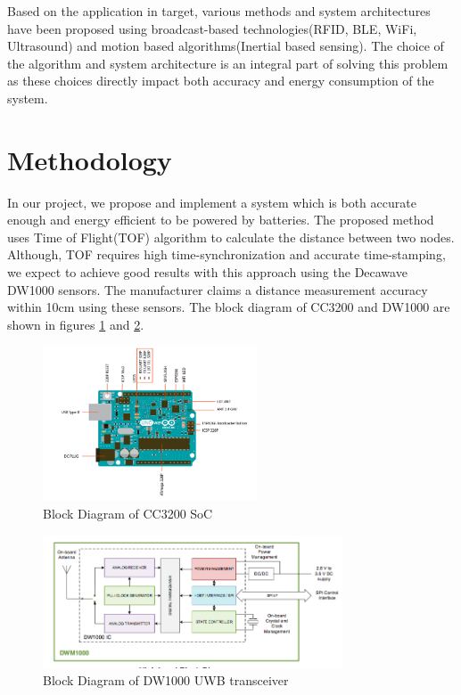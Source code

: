 \documentclass[journal,transmag]{IEEEtran}
\begin{document}
Based on the application in target, various methods and system architectures have been proposed using broadcast-based technologies(RFID, BLE\cite{IEEE}, WiFi, Ultrasound\cite{IEEE3}) and motion based algorithms(Inertial based sensing). The choice of the algorithm and system architecture is an integral part of solving this problem as these choices directly impact both accuracy and energy consumption of the system. 

\section{Methodology}
In our project, we propose and implement a system which is both accurate enough and energy efficient to be powered by batteries. The proposed method uses Time of Flight(TOF) algorithm to calculate the distance between two nodes. Although, TOF requires high time-synchronization and accurate time-stamping, we expect to achieve good results with this approach using the Decawave DW1000 sensors. The manufacturer claims a distance measurement accuracy within 10cm using these sensors.  The block diagram of CC3200 and DW1000 are shown in figures \ref{CC3200BD} and \ref{DW1000BD}.

\begin{figure}[!h]
\centering
\includegraphics[width=2.5in]{arduinounobd}
\caption{{Block Diagram of CC3200 SoC}}
\label{CC3200BD}
\end{figure}


\begin{figure}[!t]
\centering
\includegraphics[width=3.5in]{dw1000bd}
\caption{{Block Diagram of DW1000 UWB transceiver}}
\label{DW1000BD}
\end{figure}
\end{document}
